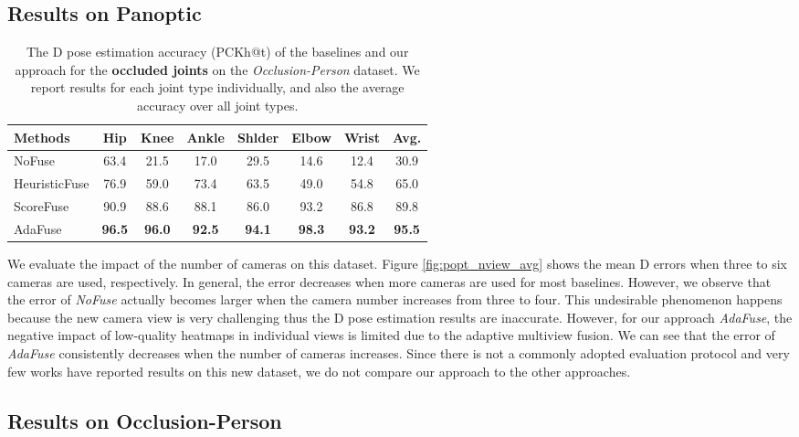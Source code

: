 \subsection{Results on Panoptic}


\begin{table}[]
\scriptsize
\centering
\caption{The D pose estimation accuracy (PCKh@t) of the baselines and our approach for the \textbf{occluded joints} on the \emph{Occlusion-Person} dataset. We report results for each joint type individually, and also the average accuracy over all joint types.}
\label{table:unreal_pckh_occluded}
\begin{tabular}{l|cccccc|c}
\toprule
 Methods       & Hip   & Knee  & Ankle  & Shlder   & Elbow   & Wrist & Avg.  \\ \hline

 NoFuse           & 63.4 & 21.5 & 17.0  & 29.5 & 14.6 & 12.4 & 30.9 \\
HeuristicFuse    & 76.9 & 59.0 & 73.4  & 63.5 & 49.0 & 54.8 & 65.0 \\
ScoreFuse        & 90.9 & 88.6 & 88.1  & 86.0 & 93.2 & 86.8 & 89.8 \\
 AdaFuse & \textbf{96.5} & \textbf{96.0} & \textbf{92.5}  & \textbf{94.1} & \textbf{98.3} & \textbf{93.2} & \textbf{95.5} \\
\toprule
\end{tabular}
\end{table}

We evaluate the impact of the number of cameras on this dataset. Figure \ref{fig:popt_nview_avg} shows the mean D errors when three to six cameras are used, respectively. In general, the error decreases when more cameras are used for most baselines. However, we observe that the error of \emph{NoFuse} actually becomes larger when the camera number increases from three to four. This undesirable phenomenon happens because the new camera view is very challenging thus the D pose estimation results are inaccurate. However, for our approach \emph{AdaFuse}, the negative impact of low-quality heatmaps in individual views is limited due to the adaptive multiview fusion. We can see that the error of \emph{AdaFuse} consistently decreases when the number of cameras increases. Since there is not a commonly adopted evaluation protocol and very few works have reported results on this new dataset, we do not compare our approach to the other approaches.




\subsection{Results on Occlusion-Person}

